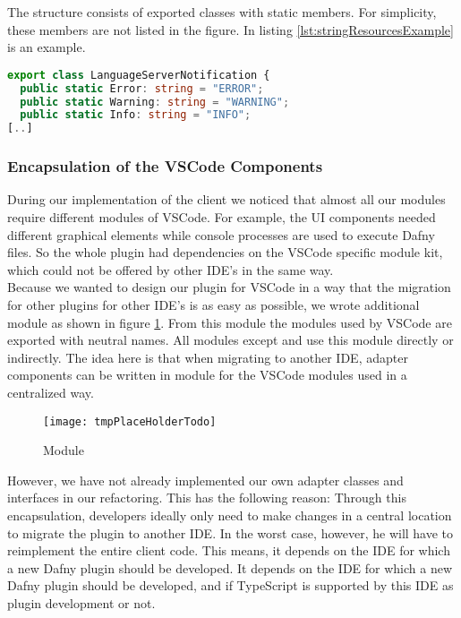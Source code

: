 The structure consists of exported classes with static members. For simplicity, these members are not listed in the figure.
In listing \ref{lst:stringResourcesExample} is an example.

\begin{lstlisting}[language=typescript, caption={Excerpt from class \code{LanguageServerNotification}}, captionpos=b, label={lst:stringResourcesExample}]
export class LanguageServerNotification {
  public static Error: string = "ERROR";
  public static Warning: string = "WARNING";
  public static Info: string = "INFO";
[..]
\end{lstlisting}

\subsubsection{Encapsulation of the VSCode Components}

During our implementation of the client we noticed that almost all our modules require different modules of VSCode.
For example, the UI components needed different graphical elements while console processes are used to execute Dafny files.
So the whole plugin had dependencies on the VSCode specific module kit,
which could not be offered by other IDE's in the same way. \\

Because we wanted to design our plugin for VSCode in a way that the migration for other plugins
for other IDE's is as easy as possible, we wrote additional module  as shown in figure \ref{fig:packageIdeApi}.
From this module the modules used by VSCode are exported with neutral names.
All modules except  and  use this module directly or indirectly.
The idea here is that when migrating to another IDE, adapter components can be written in module 
for the VSCode modules used in a centralized way.

\begin{figure}[H]
    \centering
    \texttt{[image: tmpPlaceHolderTodo]}
    \caption{Module }
    \label{fig:packageIdeApi}
\end{figure}

However, we have not already implemented our own adapter classes and interfaces in our refactoring.
This has the following reason:
Through this encapsulation, developers ideally only need to make changes in a central location to migrate the plugin to another IDE.
In the worst case, however, he will have to reimplement the entire client code.
This means, it depends on the IDE for which a new Dafny plugin should be developed.
It depends on the IDE for which a new Dafny plugin should be developed,
and if TypeScript is supported by this IDE as plugin development or not.\\

